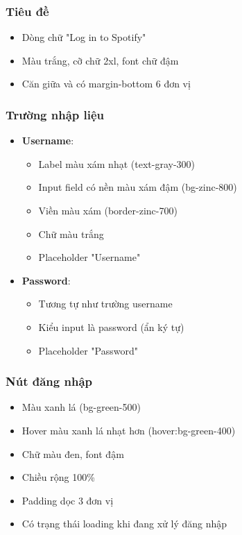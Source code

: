 \subsubsection{Tiêu đề}
\begin{itemize}
    \item Dòng chữ "Log in to Spotify"
    \item Màu trắng, cỡ chữ 2xl, font chữ đậm
    \item Căn giữa và có margin-bottom 6 đơn vị
\end{itemize}

\subsubsection{Trường nhập liệu}
\begin{itemize}
    \item \textbf{Username}:
    \begin{itemize}
        \item Label màu xám nhạt (text-gray-300)
        \item Input field có nền màu xám đậm (bg-zinc-800)
        \item Viền màu xám (border-zinc-700)
        \item Chữ màu trắng
        \item Placeholder "Username"
    \end{itemize}
    
    \item \textbf{Password}:
    \begin{itemize}
        \item Tương tự như trường username
        \item Kiểu input là password (ẩn ký tự)
        \item Placeholder "Password"
    \end{itemize}
\end{itemize}

\subsubsection{Nút đăng nhập}
\begin{itemize}
    \item Màu xanh lá (bg-green-500)
    \item Hover màu xanh lá nhạt hơn (hover:bg-green-400)
    \item Chữ màu đen, font đậm
    \item Chiều rộng 100\%
    \item Padding dọc 3 đơn vị
    \item Có trạng thái loading khi đang xử lý đăng nhập
\end{itemize}

